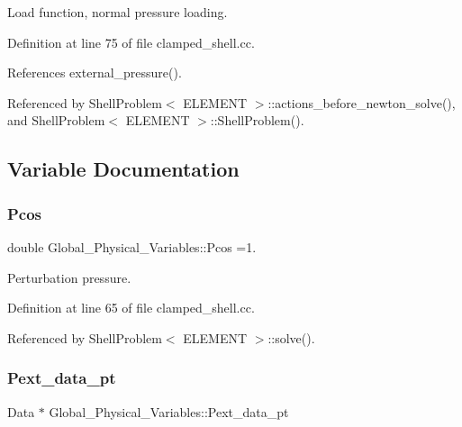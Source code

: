 Load function, normal pressure loading. 



Definition at line 75 of file clamped\+\_\+shell.\+cc.



References external\+\_\+pressure().



Referenced by Shell\+Problem$<$ E\+L\+E\+M\+E\+N\+T $>$\+::actions\+\_\+before\+\_\+newton\+\_\+solve(), and Shell\+Problem$<$ E\+L\+E\+M\+E\+N\+T $>$\+::\+Shell\+Problem().



\subsection{Variable Documentation}
\mbox{\label{namespaceGlobal__Physical__Variables_ab55734aaa66260cd9d4bf68a4ecafdd5}} 
\subsubsection{\texorpdfstring{Pcos}{Pcos}}
{\footnotesize\ttfamily double Global\+\_\+\+Physical\+\_\+\+Variables\+::\+Pcos =1.}



Perturbation pressure. 



Definition at line 65 of file clamped\+\_\+shell.\+cc.



Referenced by Shell\+Problem$<$ E\+L\+E\+M\+E\+N\+T $>$\+::solve().

\mbox{\label{namespaceGlobal__Physical__Variables_ae5107b48f68b31302f3d37b038739904}} 
\subsubsection{\texorpdfstring{Pext\+\_\+data\+\_\+pt}{Pext\_data\_pt}}
{\footnotesize\ttfamily Data $\ast$ Global\+\_\+\+Physical\+\_\+\+Variables\+::\+Pext\+\_\+data\+\_\+pt}



